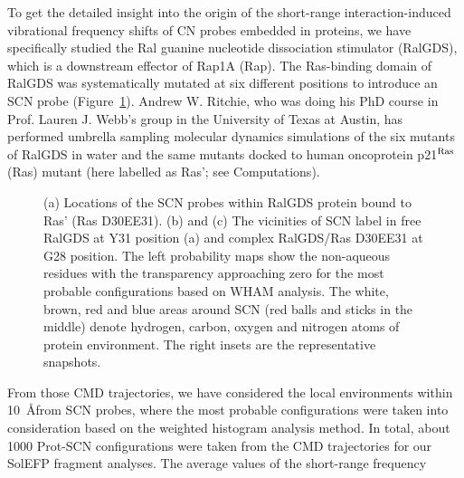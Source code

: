 \documentclass[b5paper,oneside,fleqn,11pt]{book}
\begin{document}
\begin{refsection}
To get the detailed insight into the origin of
the short\hyp{}range interaction\hyp{}induced vibrational frequency
shifts of CN probes embedded in proteins, we have specifically
studied the Ral guanine nucleotide dissociation stimulator
(RalGDS), which is a downstream effector of Rap1A (Rap). The
Ras\hyp{}binding domain of RalGDS was systematically mutated at six
different positions to introduce an SCN probe (Figure~\ref{f:prot}).   %
Andrew W. Ritchie, who was doing his PhD course in Prof. Lauren J. Webb's 
group in the University of Texas at Austin,
has performed umbrella sampling molecular dynamics
simulations of the six mutants of RalGDS in water and the same
mutants docked to human oncoprotein p21$^{\rm Ras}$ (Ras) mutant
(here labelled as Ras'; see Computations). 
%
\begin{figure}[t!]
\centering
\setlength\fboxsep{0.4pt}
\setlength\fboxrule{0.5pt}
\caption{
(a) Locations of the SCN probes within RalGDS protein bound to Ras' (Ras D30E{\textunderscore}E31).
(b) and (c) The vicinities of SCN label in free RalGDS at Y31 position (a)
and complex RalGDS/Ras D30E{\textunderscore}E31 at G28 position. The left probability maps show the
non\hyp{}aqueous residues with the transparency approaching zero for the most probable
configurations based on WHAM analysis. The white, brown, red and blue areas around SCN (red balls and sticks
in the middle) 
denote hydrogen, carbon, oxygen and nitrogen atoms of protein environment. The right insets are the representative
snapshots.
}
\label{f:prot}
\end{figure}
%
From
those CMD trajectories, we have considered the local
environments within 10~\AA from SCN probes, 
where the most probable configurations were taken
into consideration based on the weighted histogram analysis
method. In total, about 1000 Prot-SCN configurations were
taken from the CMD trajectories for our SolEFP fragment
analyses. The average values of the short\hyp{}range frequency

\end{refsection}
\end{document}
